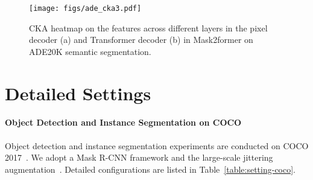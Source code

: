 \documentclass{article}
\begin{document}
\begin{figure}[h]
    \centering
    \texttt{[image: figs/ade\_cka3.pdf]}
    \caption{CKA heatmap on the features across different layers in the pixel decoder (a) and Transformer decoder (b) in Mask2former on ADE20K semantic segmentation.}
    \label{fig:ade_cka}
\end{figure}

\section{Detailed Settings}

\paragraph{Object Detection and Instance Segmentation on COCO} 

Object detection and instance segmentation experiments are conducted on COCO 2017~\cite{lin2014coco}. We adopt a Mask R-CNN framework and the large-scale jittering augmentation~\cite{simple_copy_paste}. Detailed configurations are listed in Table~\ref{table:setting-coco}.
\end{document}
